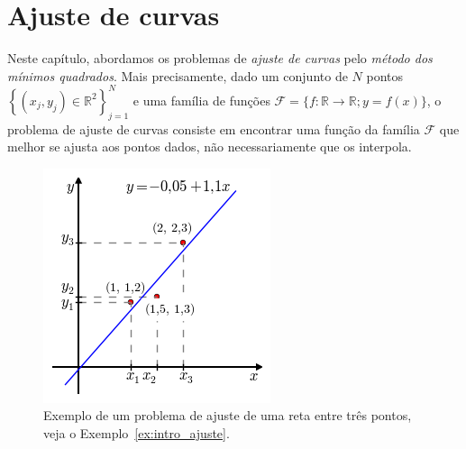 
%

\chapter{Ajuste de curvas}

Neste capítulo, abordamos os problemas de \emph{ajuste de curvas} pelo \emph{método dos mínimos quadrados}. Mais precisamente, dado um conjunto de $N$ pontos $\left\{(x_j, y_j)\in \mathbb{R}^2\right\}_{j=1}^N$ e uma família de funções $\mathcal{F} = \{f:\mathbb{R}\to\mathbb{R}; y = f(x)\}$, o problema de ajuste de curvas consiste em encontrar uma função da família $\mathcal{F}$ que melhor se ajusta aos pontos dados, não necessariamente que os interpola. 

\begin{figure}[h!]
  \centering
  \includegraphics[scale=0.9]{./cap_ajuste/pics/ex_intro_ajuste/ex_intro_ajuste}
  \caption{Exemplo de um problema de ajuste de uma reta entre três pontos, veja o Exemplo~\ref{ex:intro_ajuste}.}
  \label{fig:ex_intro}
\end{figure}

